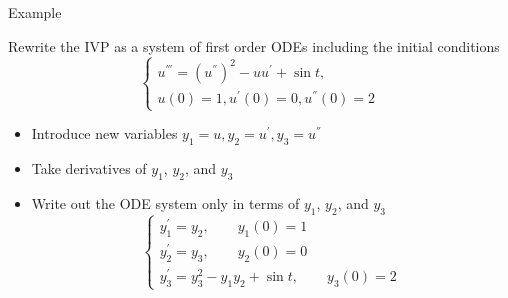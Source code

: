 \documentclass[10pt]{beamer}
\begin{document}
\begin{frame}{Example}
\begin{example}
Rewrite the IVP as a system of first order ODEs including the initial conditions
\[
\begin{cases}
u^{'''} = (u^{''})^2 - u u^\prime + \sin t,\\
u(0) = 1, u^\prime(0) = 0, u^{''}(0) = 2
\end{cases}
\]  
\end{example}
\begin{itemize}
    \item Introduce new variables  $y_1 = u, y_2 = u^\prime, y_3 = u^{''}$
    \item Take derivatives of $y_1$, $y_2$, and $y_3$
    \item Write out the ODE system only in terms of $y_1$, $y_2$, and $y_3$
        \[
        \begin{cases}
        y_1^\prime = y_2, \qquad y_1(0) = 1\\
        y_2^\prime = y_3, \qquad y_2(0) = 0\\
        y_3^\prime = y_3^2 - y_1 y_2 + \sin t, \qquad y_3(0) = 2
        \end{cases}
        \]
\end{itemize}
\end{frame}





\end{document}
